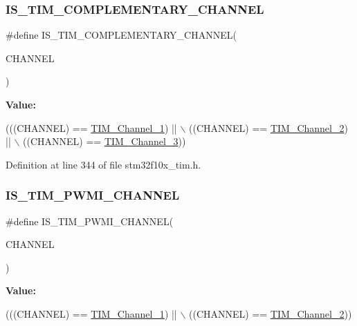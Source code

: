\subsubsection{\texorpdfstring{I\+S\+\_\+\+T\+I\+M\+\_\+\+C\+O\+M\+P\+L\+E\+M\+E\+N\+T\+A\+R\+Y\+\_\+\+C\+H\+A\+N\+N\+EL}{IS\_TIM\_COMPLEMENTARY\_CHANNEL}}
{\footnotesize\ttfamily \#define I\+S\+\_\+\+T\+I\+M\+\_\+\+C\+O\+M\+P\+L\+E\+M\+E\+N\+T\+A\+R\+Y\+\_\+\+C\+H\+A\+N\+N\+EL(\begin{DoxyParamCaption}\item[{}]{C\+H\+A\+N\+N\+EL }\end{DoxyParamCaption})}

{\bfseries Value\+:}
\begin{DoxyCode}
(((CHANNEL) == \hyperlink{group___t_i_m___channel_ga69ea7f558f02c63dd1082d784d2449bd}{TIM\_Channel\_1}) || \(\backslash\)
                                               ((CHANNEL) == \hyperlink{group___t_i_m___channel_ga03d7da8269a87a560f68985b4bd80931}{TIM\_Channel\_2}) || \(\backslash\)
                                               ((CHANNEL) == \hyperlink{group___t_i_m___channel_ga012711b19e8c91f6f352801a3dc0bcc9}{TIM\_Channel\_3}))
\end{DoxyCode}


Definition at line 344 of file stm32f10x\+\_\+tim.\+h.

\mbox{\label{group___t_i_m___channel_gacbf272b7a14f63b38bdbf18577835dce}} 
\subsubsection{\texorpdfstring{I\+S\+\_\+\+T\+I\+M\+\_\+\+P\+W\+M\+I\+\_\+\+C\+H\+A\+N\+N\+EL}{IS\_TIM\_PWMI\_CHANNEL}}
{\footnotesize\ttfamily \#define I\+S\+\_\+\+T\+I\+M\+\_\+\+P\+W\+M\+I\+\_\+\+C\+H\+A\+N\+N\+EL(\begin{DoxyParamCaption}\item[{}]{C\+H\+A\+N\+N\+EL }\end{DoxyParamCaption})}

{\bfseries Value\+:}
\begin{DoxyCode}
(((CHANNEL) == \hyperlink{group___t_i_m___channel_ga69ea7f558f02c63dd1082d784d2449bd}{TIM\_Channel\_1}) || \(\backslash\)
                                      ((CHANNEL) == \hyperlink{group___t_i_m___channel_ga03d7da8269a87a560f68985b4bd80931}{TIM\_Channel\_2}))
\end{DoxyCode}


